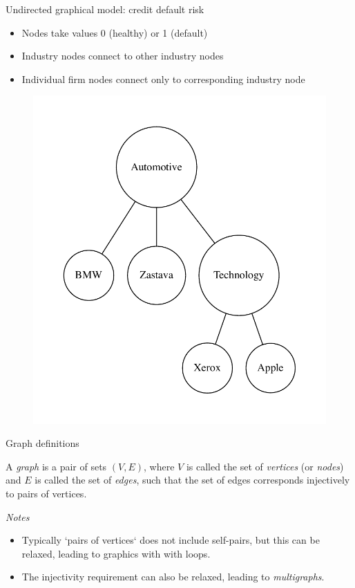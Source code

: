 \begin{frame}{Undirected graphical model: credit default risk \cite{filiz2012graphical}}
  \begin{itemize}
    \item Nodes take values 0 (healthy) or 1 (default)
    \item Industry nodes connect to other industry nodes
    \item Individual firm nodes connect only to corresponding industry node
  \end{itemize}
  \begin{figure}[ht]
    \centering
    \includegraphics[height=0.6\textheight]{graphics/credit_default}
  \end{figure}
\end{frame}


\begin{frame}{Graph definitions}
  \begin{definition}
    A \emph{graph} is a pair of sets $(V, E)$, where $V$ is called the set of \emph{vertices} (or \emph{nodes}) and $E$ is called the set of \emph{edges}, such that the set of edges corresponds injectively to pairs of vertices. \newline
  \end{definition}

  \emph{Notes}
  \begin{itemize}
    \item Typically `pairs of vertices` does not include self-pairs, but this can be relaxed, leading to graphics with with loops.
    \item The injectivity requirement can also be relaxed, leading to \emph{multigraphs}.
  \end{itemize}
\end{frame}


